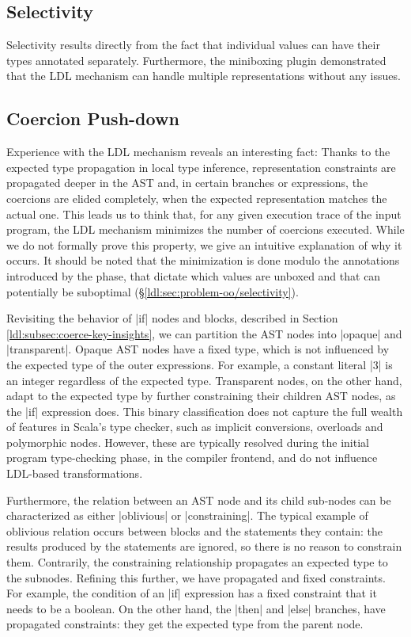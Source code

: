 \subsection{Selectivity}

Selectivity results directly from the fact that individual values can have their types annotated separately. Furthermore, the miniboxing plugin demonstrated that the LDL mechanism can handle multiple representations without any issues.

\subsection{Coercion Push-down}
\label{ldl:sec:transform-props/optimality}

Experience with the LDL mechanism reveals an interesting fact: Thanks to the expected type propagation in local type inference, representation constraints are propagated deeper in the AST and, in certain branches or expressions, the coercions are elided completely, when the expected representation matches the actual one. This leads us to think that, for any given execution trace of the input program, the LDL mechanism minimizes the number of coercions executed. While we do not formally prove this property, we give an intuitive explanation of why it occurs. It should be noted that the minimization is done modulo the annotations introduced by the \inject{} phase, that dictate which values are unboxed and that can potentially be suboptimal (\S\ref{ldl:sec:problem-oo/selectivity}).

Revisiting the behavior of |if| nodes and blocks, described in Section \ref{ldl:subsec:coerce-key-insights}, we can partition the AST nodes into |opaque| and |transparent|. Opaque AST nodes have a fixed type, which is not influenced by the expected type of the outer expressions. For example, a constant literal |3| is an integer regardless of the expected type. Transparent nodes, on the other hand, adapt to the expected type by further constraining their children AST nodes, as the |if| expression does. This binary classification does not capture the full wealth of features in Scala's type checker, such as implicit conversions, overloads and polymorphic nodes. However, these are typically resolved during the initial program type-checking phase, in the compiler frontend, and do not influence LDL-based transformations.

Furthermore, the relation between an AST node and its child sub-nodes can be characterized as either |oblivious| or |constraining|. The typical example of oblivious relation occurs between blocks and the statements they contain: the results produced by the statements are ignored, so there is no reason to constrain them. Contrarily, the constraining relationship propagates an expected type to the subnodes. Refining this further, we have propagated and fixed constraints. For example, the condition of an |if| expression has a fixed constraint that it needs to be a boolean. On the other hand, the |then| and |else| branches, have propagated constraints: they get the expected type from the parent node.

